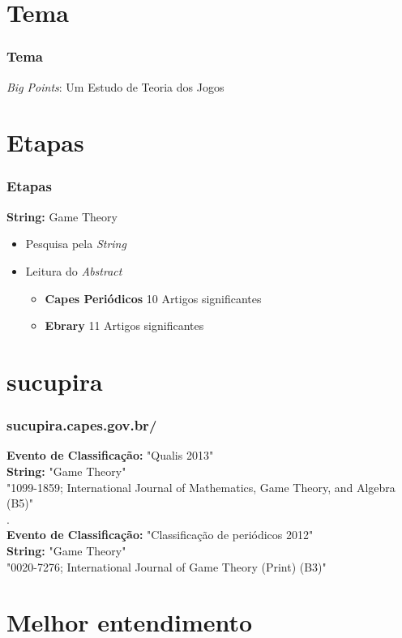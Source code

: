 \section{Tema}

\begin{frame}
\frametitle{Tema}
\begin{block}{}
 \textit{Big Points}: Um Estudo de Teoria dos Jogos
\end{block}
\end{frame}

\section{Etapas}
\begin{frame}
\frametitle{Etapas}
\textbf{String:} Game Theory
\begin{itemize}
\item Pesquisa pela \textit{String}
\item Leitura do \textit{Abstract}
\begin{itemize}
    \item \textbf{Capes Periódicos} 10 Artigos significantes
    \item \textbf{Ebrary} 11 Artigos significantes
\end{itemize}
\end{itemize}
\end{frame}

\section{sucupira}
\begin{frame}
\frametitle{sucupira.capes.gov.br/}

\textbf{Evento de Classificação:} "Qualis 2013"\\
\textbf{String:} "Game Theory"\\
"1099-1859; International Journal of Mathematics, Game Theory, and Algebra (B5)"\\
.\\
\textbf{Evento de Classificação:} "Classificação de periódicos 2012"\\
\textbf{String:} "Game Theory"\\
"0020-7276; International Journal of Game Theory (Print) (B3)"
\end{frame}

\section{Melhor entendimento}
